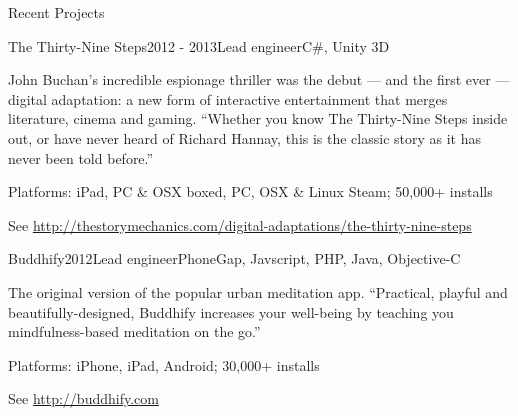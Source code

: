 \documentclass{resume} %
\begin{document}
\begin{rSection}{Recent Projects}
\begin{rSubsection}{The Thirty-Nine Steps}{2012 - 2013}{Lead engineer}{C\#, Unity 3D}
\item John Buchan's incredible espionage thriller was the debut --- and the first ever --- digital adaptation: a new form of interactive entertainment that merges literature, cinema and gaming. ``Whether you know The Thirty-Nine Steps inside out, or have never heard of Richard Hannay, this is the classic story as it has never been told before.''
\item Platforms: iPad, PC \& OSX boxed, PC, OSX \& Linux Steam; 50,000+ installs
\item See \url{http://thestorymechanics.com/digital-adaptations/the-thirty-nine-steps}
\end{rSubsection}

\begin{rSubsection}{Buddhify}{2012}{Lead engineer}{PhoneGap, Javscript, PHP, Java, Objective-C}
\item The original version of the popular urban meditation app. ``Practical, playful and beautifully-designed, Buddhify increases your well-being by teaching you mindfulness-based meditation on the go.''
\item Platforms: iPhone, iPad, Android; 30,000+ installs
\item See \url{http://buddhify.com}
\end{rSubsection}



\end{rSection}

\end{document}
